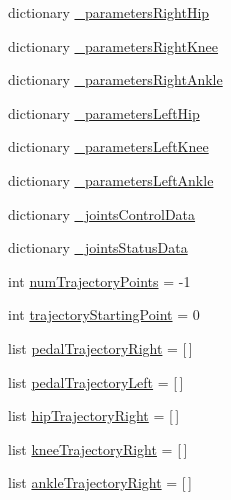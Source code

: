 \begin{DoxyCompactItemize}
\item 
dictionary \mbox{\hyperlink{namespacepedal__simulation_a5e2a6f340430b2f768cccd2ee8799462}{\+\_\+parameters\+Right\+Hip}}
\item 
dictionary \mbox{\hyperlink{namespacepedal__simulation_aa82056fb0a0641314c28a1e8a73325d5}{\+\_\+parameters\+Right\+Knee}}
\item 
dictionary \mbox{\hyperlink{namespacepedal__simulation_a60241d4aea32187367516779d5e0e72a}{\+\_\+parameters\+Right\+Ankle}}
\item 
dictionary \mbox{\hyperlink{namespacepedal__simulation_a5708d5a0da5e620e11e2b72890447d25}{\+\_\+parameters\+Left\+Hip}}
\item 
dictionary \mbox{\hyperlink{namespacepedal__simulation_a0a86addbabf6534ae56e5c2967886a67}{\+\_\+parameters\+Left\+Knee}}
\item 
dictionary \mbox{\hyperlink{namespacepedal__simulation_a6058204fc868715a30e0368a9c4ebc57}{\+\_\+parameters\+Left\+Ankle}}
\item 
dictionary \mbox{\hyperlink{namespacepedal__simulation_a85a4d895189d151657b0867797bf1a09}{\+\_\+joints\+Control\+Data}}
\item 
dictionary \mbox{\hyperlink{namespacepedal__simulation_a60fc1e2941ecbd76f24d5190414a13b8}{\+\_\+joints\+Status\+Data}}
\item 
int \mbox{\hyperlink{namespacepedal__simulation_a1ece2e2b30d10ccc34c2f26508791e20}{num\+Trajectory\+Points}} = -\/1
\item 
int \mbox{\hyperlink{namespacepedal__simulation_ad7731301036c8b6b468b20d1b5aaed21}{trajectory\+Starting\+Point}} = 0
\item 
list \mbox{\hyperlink{namespacepedal__simulation_ac6c7d66bbded17d43bfbac519fd74972}{pedal\+Trajectory\+Right}} = \mbox{[}$\,$\mbox{]}
\item 
list \mbox{\hyperlink{namespacepedal__simulation_a12e73e8d9659f2c2cc7a34402adc9698}{pedal\+Trajectory\+Left}} = \mbox{[}$\,$\mbox{]}
\item 
list \mbox{\hyperlink{namespacepedal__simulation_a8203cc4243bfe20af84c0116c8cda802}{hip\+Trajectory\+Right}} = \mbox{[}$\,$\mbox{]}
\item 
list \mbox{\hyperlink{namespacepedal__simulation_a917db9bbb8bc8e0577bf0a84ab41f58a}{knee\+Trajectory\+Right}} = \mbox{[}$\,$\mbox{]}
\item 
list \mbox{\hyperlink{namespacepedal__simulation_a1ad9055051bf67d8eb766574be88d5f9}{ankle\+Trajectory\+Right}} = \mbox{[}$\,$\mbox{]}
\item 

\end{DoxyCompactItemize}
